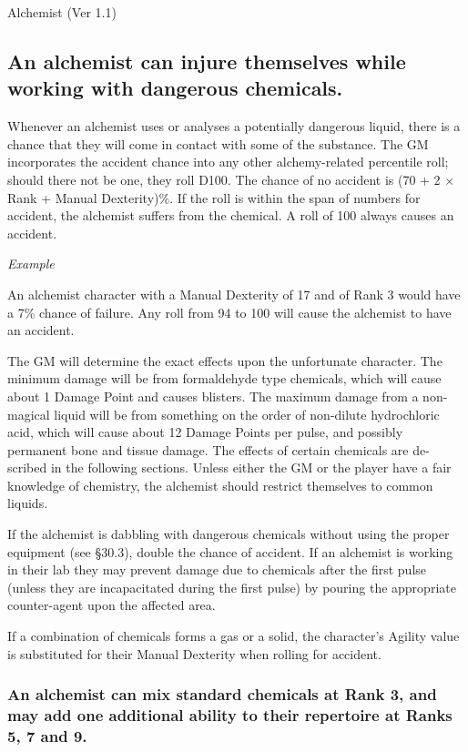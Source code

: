 \begin{Chapter}{Alchemist (Ver 1.1)}
\subsection{An alchemist can injure themselves while working with dangerous chemicals.}

Whenever an alchemist uses or analyses a potentially dangerous liquid,
there is a chance that they will come in contact with some of the
substance.  The GM incorporates the accident chance into any other
alchemy-related percentile roll; should there not be one, they roll
D100.  The chance of no accident is (70 + 2 × Rank + Manual
Dexterity)\%.  If the roll is within the span of numbers for accident,
the alchemist suffers from the chemical.  A roll of 100 always causes
an accident.

\emph{Example}

An alchemist character with a Manual Dexterity of 17 and of
Rank 3 would have a 7\% chance of failure. Any roll from 94 to 100
will cause the alchemist to have an accident.

The GM will determine the exact effects upon the unfortunate
character.  The minimum damage will be from formaldehyde type
chemicals, which will cause about 1 Damage Point and causes blisters.
The maximum damage from a non-magical liquid will be from something on
the order of non-dilute hydrochloric acid, which will cause about 12
Damage Points per pulse, and possibly permanent bone and tissue
damage.  The effects of certain chemicals are de- scribed in the
following sections. Unless either the GM or the player have a fair
knowledge of chemistry, the alchemist should restrict themselves to
common liquids.

If the alchemist is dabbling with dangerous chemicals without using
the proper equipment (see §30.3), double the chance of accident. If an
alchemist is working in their lab they may prevent damage due to
chemicals after the first pulse (unless they are incapacitated during
the first pulse) by pouring the appropriate counter-agent upon the
affected area.

If a combination of chemicals forms a gas or a solid, the character’s
Agility value is substituted for their Manual Dexterity when rolling
for accident.

\subsubsection{An alchemist can mix standard chemicals at Rank 3, and may add one
additional ability to their repertoire at Ranks 5, 7 and 9.}


\end{Chapter}
